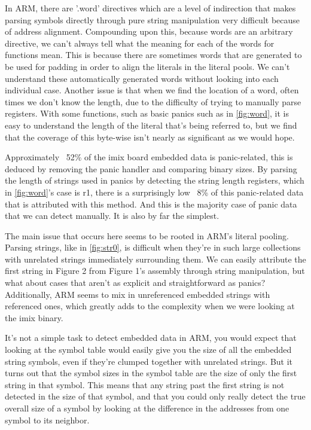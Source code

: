\documentclass{article}
\begin{document}
In ARM, there are '.word' directives which are a level of indirection that makes parsing symbols directly through pure string manipulation very difficult because of address alignment. Compounding upon this, because words are an arbitrary directive, we can't always tell what the meaning for each of the words for functions mean. This is because there are sometimes words that are generated to be used for padding in order to align the literals in the literal pools. We can't understand these automatically generated words without looking into each individual case. Another issue is that when we find the location of a word, often times we don't know the length, due to the difficulty of trying to manually parse registers. With some functions, such as basic panics such as in \autoref{fig:word}, it is easy to understand the length of the literal that's being referred to, but we find that the coverage of this byte-wise isn't nearly as significant as we would hope.

Approximately ~52\% of the imix board embedded data is panic-related, this is deduced by removing the panic handler and comparing binary sizes. By parsing the length of strings used in panics by detecting the string length registers, which in \autoref{fig:word}'s case is r1, there is a surprisingly low ~8\% of this panic-related data that is attributed with this method. And this is the majority case of panic data that we can detect manually. It is also by far the simplest.

The main issue that occurs here seems to be rooted in ARM's literal pooling. Parsing strings, like in \autoref{fig:str0}, is difficult when they're in such large collections with unrelated strings immediately surrounding them. We can easily attribute the first string in Figure 2 from Figure 1's assembly through string manipulation, but what about cases that aren't as explicit and straightforward as panics? Additionally, ARM seems to mix in unreferenced embedded strings with referenced ones, which greatly adds to the complexity when we were looking at the imix binary.

It's not a simple task to detect embedded data in ARM, you would expect that looking at the symbol table would easily give you the size of all the embedded string symbols, even if they're clumped together with unrelated strings. But it turns out that the symbol sizes in the symbol table are the size of only the first string in that symbol. This means that any string past the first string is not detected in the size of that symbol, and that you could only really detect the true overall size of a symbol by looking at the difference in the addresses from one symbol to its neighbor.
\end{document}
